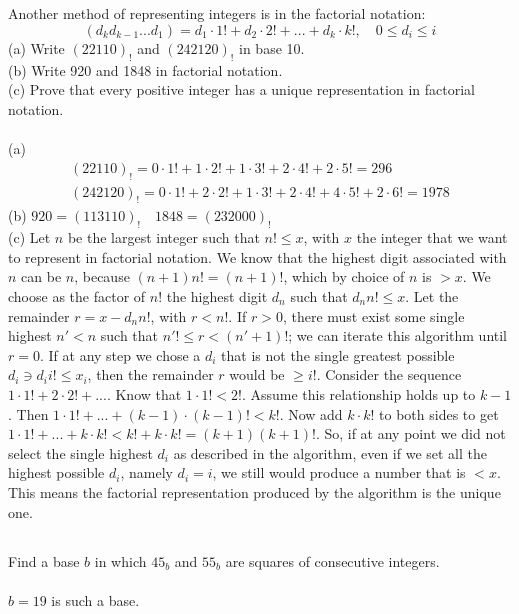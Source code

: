 \documentclass{article} \usepackage{amsmath}
\begin{document}
\subsection{}
Another method of representing integers is in the factorial notation:
\begin{equation*}
    (d_kd_{k-1}...d_1) = d_1 \cdot 1! + d_2 \cdot 2! + ... + d_k \cdot k!, \quad
    0 \leq d_i \leq i
\end{equation*}
(a) Write $(22110)_!$ and $(242120)_!$ in base 10.\\
(b) Write 920 and 1848 in factorial notation.\\
(c) Prove that every positive integer has a unique representation in factorial
notation.\\~\\
(a)
\begin{gather*}
    (22110)_! = 0 \cdot 1! + 1 \cdot 2! + 1 \cdot 3! + 2 \cdot 4! + 2 \cdot 5! = 296\\
    (242120)_! = 0 \cdot 1! + 2 \cdot 2! + 1 \cdot 3! + 2 \cdot 4! + 4 \cdot 5!
    + 2 \cdot 6! = 1978
\end{gather*}
(b) $920 = (113110)_! \quad 1848 = (232000)_!$\\
(c) Let $n$ be the largest integer such that $n! \leq x$, with $x$ the integer that
we want to represent in factorial notation.
We know that the highest digit associated with $n$ can be $n$, because
$(n + 1)n! = (n + 1)!$, which by choice of $n$ is $> x$.
We choose as the factor of $n!$ the highest digit $d_n$ such that $d_nn! \leq x$.
Let the remainder $r = x - d_nn!$, with $r < n!$.
If $r > 0$, there must exist some single highest $n' < n$ such that
$n'! \leq r < (n' + 1)!$; we can iterate this algorithm until $r = 0$.
If at any step we chose a $d_i$ that is not the single greatest possible
$d_i \ni d_ii! \leq x_i$, then the remainder $r$ would be $\geq i!$.
Consider the sequence $1 \cdot 1! + 2 \cdot 2! + ...$.
Know that $1 \cdot 1! < 2!$.
Assume this relationship holds up to $k - 1$.
Then $1 \cdot 1! + ... + (k - 1) \cdot (k - 1)! < k!$.
Now add $k \cdot k!$ to both sides to get
$1 \cdot 1! + ... + k \cdot k! < k! + k \cdot k! = (k + 1)(k + 1)!$.
So, if at any point we did not select the single highest $d_i$ as described in the
algorithm, even if we set all the highest possible $d_i$, namely $d_i = i$,
we still would produce a number that is $< x$.
This means the factorial representation produced by the algorithm is the unique one.

\subsection{}
Find a base $b$ in which $45_b$ and $55_b$ are squares of consecutive integers.\\~\\
$b = 19$ is such a base.
\end{document}
